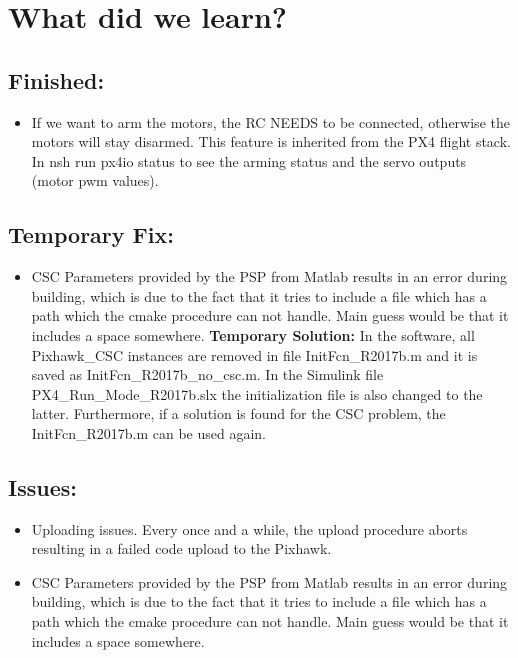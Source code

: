 \chapter{What did we learn?}
\section{Finished:}
\begin{itemize}
	\item If we want to arm the motors, the RC NEEDS to be connected, otherwise the motors will stay disarmed. This feature is inherited from the PX4 flight stack.
	In nsh run px4io status to see the arming status and the servo outputs (motor pwm values).
\end{itemize}

\section{Temporary Fix:}
\begin{itemize}
	\item CSC Parameters provided by the PSP from Matlab results in an error during building, which is due to the fact that it tries to include a file which has a path which the cmake procedure can not handle. Main guess would be that it includes a space somewhere. \textbf{Temporary Solution:} In the software, all Pixhawk\_CSC instances are removed in file InitFcn\_R2017b.m and it is saved as InitFcn\_R2017b\_no\_csc.m. In the Simulink file PX4\_Run\_Mode\_R2017b.slx the initialization file is also changed to the latter. Furthermore, if a solution is found for the CSC problem, the InitFcn\_R2017b.m can be used again.
\end{itemize}

\section{Issues:}
\begin{itemize}
	\item Uploading issues. Every once and a while, the upload procedure aborts resulting in a failed code upload to the Pixhawk.
	\item CSC Parameters provided by the PSP from Matlab results in an error during building, which is due to the fact that it tries to include a file which has a path which the cmake procedure can not handle. Main guess would be that it includes a space somewhere.
\end{itemize}